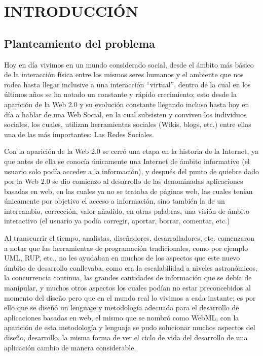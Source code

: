 \documentclass[oneside,12pt,a4paper]{memoir}%
\begin{document}
\chapter{INTRODUCCI\'ON}
\label{chap:Introduction}
	\section{Planteamiento del problema}
	\label{sec:Problem}
	Hoy en d\'ia vivimos en un mundo considerado social, desde el \'ambito m\'as
	b\'asico de la interacci\'on f\'isica entre los mismos seres humanos y el
	ambiente que nos rodea hasta llegar inclusive a una interacci\'on ``virtual'',
	dentro de la cual en los \'ultimos a\~nos se ha notado un constante y r\'apido
	crecimiento; esto desde la aparici\'on de la Web 2.0 y su evoluci\'on 
	constante llegando incluso hasta hoy en d\'ia a hablar de una Web Social, en la
	cual subsisten y conviven los individuos sociales, los cuales, utilizan
	herramientas sociales (Wikis, blogs, etc.) entre ellas una de las m\'as
	importantes: Las Redes Sociales.
	 
	Con la aparici\'on de la Web 2.0 se cerr\'o una etapa en la historia de la
	Internet, ya que antes de ella se conoc\'ia \'unicamente una Internet de \'ambito
	informativo (el usuario solo pod\'ia acceder a la informaci\'on), y despu\'es del
	punto de quiebre dado por la Web 2.0 se dio comienzo al desarrollo de las
	denominadas aplicaciones basadas en web, en las cuales ya no se trataba
	de p\'aginas web, las cuales ten\'ian  \'unicamente por objetivo el acceso a
	informaci\'on, sino tambi\'en la de un intercambio, correcci\'on, valor
	a\~nadido, en otras palabras, una visi\'on de \'ambito interactivo (el usuario
	ya pod\'ia corregir, aportar, borrar, comentar, etc.)
 
	Al transcurrir el tiempo, analistas, dise\~nadores, desarrolladores, etc.
	comenzaron a notar que las herramientas de programaci\'on tradicionales, como por
	ejemplo \ac{UML}, \ac{RUP}, etc., no les ayudaban en muchos de los aspectos que
	este nuevo \'ambito de desarrollo conllevaba, como era la escalabilidad a niveles
	astron\'omicos, la concurrencia continua, las grandes cantidades de informaci\'on
	que se deb\'ia de manipular, y muchos otros aspectos los cuales pod\'ian no estar
	preconcebidos al momento del dise\~no pero que en el mundo real lo vivimos a cada
	instante; es por ello que se dise\~n\'o un lenguaje y metodolog\'ia adecuada para el
	desarrollo de aplicaciones basadas en web, el mismo que se nombr\'o como
	\ac{WebML}, con la aparici\'on de esta metodolog\'ia y lenguaje se pudo solucionar
	muchos aspectos del dise\~no, desarrollo, la misma forma de ver el ciclo de vida
	del desarrollo de una aplicaci\'on cambio de manera considerable.
	 
\end{document}
